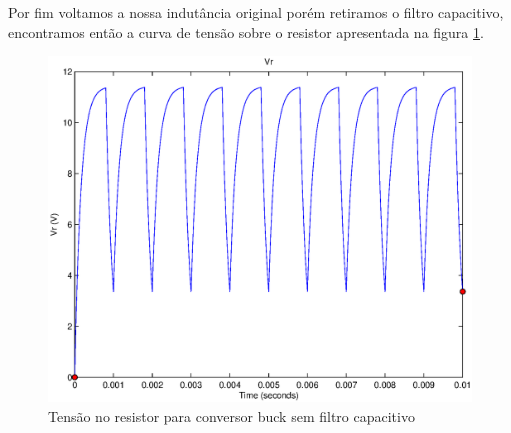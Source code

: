 \documentclass{article}
\begin{document}

Por fim voltamos a nossa indutância original porém retiramos o filtro capacitivo, encontramos então a curva de tensão sobre o resistor apresentada na figura \ref{fig:br3}.
\begin{figure}[H]
	\centering
	\includegraphics[width=0.7\linewidth]{matlab/buck/b_vr3}
	\caption{Tensão no resistor para conversor buck sem filtro capacitivo}
	\label{fig:br3}
\end{figure}


\end{document}
